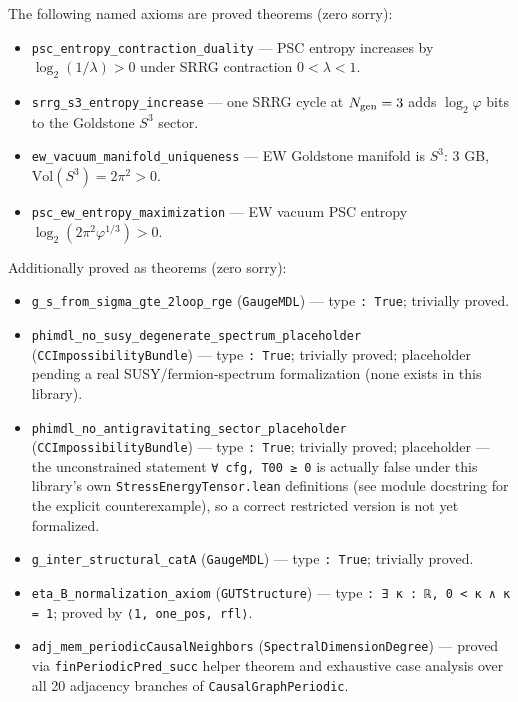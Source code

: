 \documentclass[11pt,a4paper]{article}
\theoremstyle{definition}
\begin{document}
The following named axioms are proved theorems (zero sorry):
\begin{itemize}[nosep]
\item \lstinline|psc_entropy_contraction_duality| — PSC entropy increases by
  $\log_2(1/\lambda) > 0$ under SRRG contraction $0 < \lambda < 1$.
\item \lstinline|srrg_s3_entropy_increase| — one SRRG cycle at $N_{\rm gen} = 3$
  adds $\log_2\varphi$ bits to the Goldstone $S^3$ sector.
\item \lstinline|ew_vacuum_manifold_uniqueness| — EW Goldstone manifold is $S^3$:
  3 GB, $\mathrm{Vol}(S^3) = 2\pi^2 > 0$.
\item \lstinline|psc_ew_entropy_maximization| — EW vacuum PSC entropy
  $\log_2(2\pi^2\varphi^{1/3}) > 0$.
\end{itemize}

Additionally proved as theorems (zero sorry):
\begin{itemize}[nosep]
\item \lstinline|g_s_from_sigma_gte_2loop_rge| (\texttt{GaugeMDL}) — type \lstinline|: True|; trivially proved.
\item \lstinline|phimdl_no_susy_degenerate_spectrum_placeholder| (\texttt{CCImpossibilityBundle}) — type \lstinline|: True|; trivially proved; placeholder pending a real SUSY/fermion-spectrum formalization (none exists in this library).
\item \lstinline|phimdl_no_antigravitating_sector_placeholder| (\texttt{CCImpossibilityBundle}) — type \lstinline|: True|; trivially proved; placeholder — the unconstrained statement \lstinline|∀ cfg, T00 ≥ 0| is actually false under this library's own \texttt{StressEnergyTensor.lean} definitions (see module docstring for the explicit counterexample), so a correct restricted version is not yet formalized.
\item \lstinline|g_inter_structural_catA| (\texttt{GaugeMDL}) — type \lstinline|: True|; trivially proved.
\item \lstinline|eta_B_normalization_axiom| (\texttt{GUTStructure}) — type \lstinline|: ∃ κ : ℝ, 0 < κ ∧ κ = 1|; proved by \lstinline|⟨1, one_pos, rfl⟩|.
\item \lstinline|adj_mem_periodicCausalNeighbors| (\texttt{SpectralDimensionDegree}) — proved via
  \lstinline|finPeriodicPred_succ| helper theorem and exhaustive case analysis
  over all 20 adjacency branches of \lstinline|CausalGraphPeriodic|.
\end{itemize}
\end{document}
